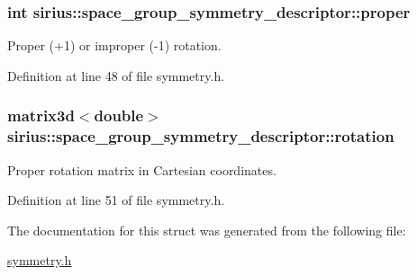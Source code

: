 \subsubsection[{proper}]{\setlength{\rightskip}{0pt plus 5cm}int sirius\+::space\+\_\+group\+\_\+symmetry\+\_\+descriptor\+::proper}\label{structsirius_1_1space__group__symmetry__descriptor_a50795c4d0bc499797b69b9386bc39724}


Proper (+1) or improper (-\/1) rotation. 



Definition at line 48 of file symmetry.\+h.

\hypertarget{structsirius_1_1space__group__symmetry__descriptor_a6a3d9fcab0e0cceb5d8a8cba6c0cbbdc}{}
\subsubsection[{rotation}]{\setlength{\rightskip}{0pt plus 5cm}matrix3d$<$double$>$ sirius\+::space\+\_\+group\+\_\+symmetry\+\_\+descriptor\+::rotation}\label{structsirius_1_1space__group__symmetry__descriptor_a6a3d9fcab0e0cceb5d8a8cba6c0cbbdc}


Proper rotation matrix in Cartesian coordinates. 



Definition at line 51 of file symmetry.\+h.



The documentation for this struct was generated from the following file\+:\begin{DoxyCompactItemize}
\item 
\hyperlink{symmetry_8h}{symmetry.\+h}\end{DoxyCompactItemize}
